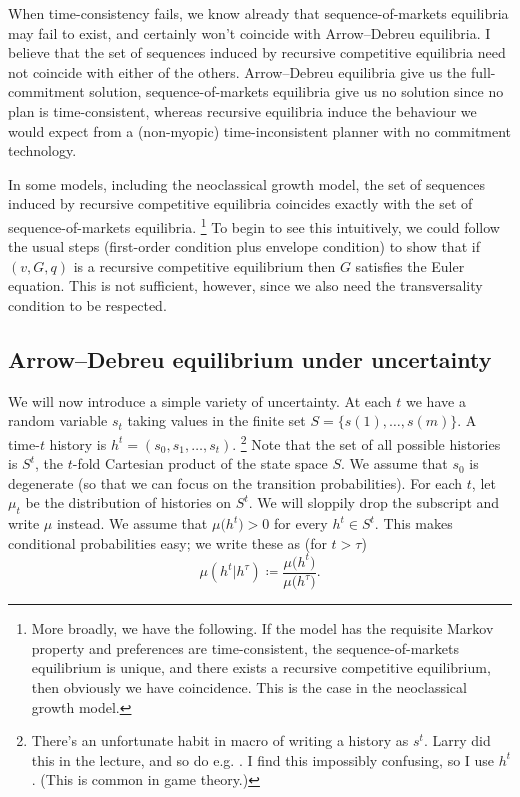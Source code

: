 \documentclass[11pt,letterpaper,reqno,oneside]{article}
\begin{document}
When time-consistency fails, we know already that sequence-of-markets equilibria may fail to exist, and certainly won't coincide with Arrow--Debreu equilibria. I believe that the set of sequences induced by recursive competitive equilibria need not coincide with either of the others. Arrow--Debreu equilibria give us the full-commitment solution, sequence-of-markets equilibria give us no solution since no plan is time-consistent, whereas recursive equilibria induce the behaviour we would expect from a (non-myopic) time-inconsistent planner with no commitment technology.

In some models, including the neoclassical growth model, the set of sequences induced by recursive competitive equilibria coincides exactly with the set of sequence-of-markets equilibria.%
	\footnote{More broadly, we have the following. If the model has the requisite Markov property and preferences are time-consistent, the sequence-of-markets equilibrium is unique, and there exists a recursive competitive equilibrium, then obviously we have coincidence. This is the case in the neoclassical growth model.}
To begin to see this intuitively, we could follow the usual steps (first-order condition plus envelope condition) to show that if $(v,G,q)$ is a recursive competitive equilibrium then $G$ satisfies the Euler equation. This is not sufficient, however, since we also need the transversality condition to be respected.



\subsection{Arrow--Debreu equilibrium under uncertainty}
\label{sec:14Oct2015:AD_eqm_uncertainty}

We will now introduce a simple variety of uncertainty. At each $t$ we have a random variable $s_t$ taking values in the finite set $S = \{ s(1), \dots, s(m) \}$. A time-$t$ history is $h^t = ( s_0, s_1, \dots, s_t )$.%
	\footnote{There's an unfortunate habit in macro of writing a history as $s^t$. Larry did this in the lecture, and so do e.g. \textcite{LjungqvistSargent2012}. I find this impossibly confusing, so I use $h^t$. (This is common in game theory.)}
Note that the set of all possible histories is $S^t$, the $t$-fold Cartesian product of the state space $S$. We assume that $s_0$ is degenerate (so that we can focus on the transition probabilities). For each $t$, let $\mu_t$ be the distribution of histories on $S^t$. We will sloppily drop the subscript and write $\mu$ instead. We assume that $\mu\bigl(h^t\bigr) > 0$ for every $h^t \in S^t$. This makes conditional probabilities easy; we write these as (for $t>\tau$)
%
\begin{equation*}
	\mu(h^t|h^\tau) 
	\coloneqq \frac{ \mu\bigl(h^t\bigr) }
	{ \mu\bigl(h^\tau\bigr) } .
\end{equation*}
\end{document}

